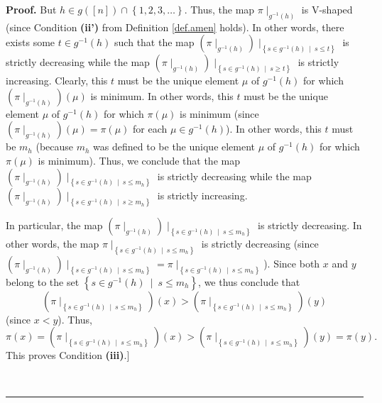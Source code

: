 \documentclass[numbers=enddot,12pt,final,onecolumn,notitlepage]{scrartcl}%
\theoremstyle{definition}
\newenvironment{proof}[1][Proof]{\noindent\textbf{#1.} }{\ \rule{0.5em}{0.5em}}
\newenvironment{verlong}{}{}
\begin{document}
\begin{verlong}
\begin{proof}
But $h\in g\left(  \left[  n\right]  \right)  \cap\left\{  1,2,3,\ldots
\right\}  $. Thus, the map $\pi\mid_{g^{-1}\left(  h\right)  }$ is V-shaped
(since Condition \textbf{(ii')} from Definition \ref{def.amen} holds). In
other words, there exists some $t\in g^{-1}\left(  h\right)  $ such that the
map $\left(  \pi\mid_{g^{-1}\left(  h\right)  }\right)  \mid_{\left\{  s\in
g^{-1}\left(  h\right)  \ \mid\ s\leq t\right\}  }$ is strictly decreasing
while the map $\left(  \pi\mid_{g^{-1}\left(  h\right)  }\right)
\mid_{\left\{  s\in g^{-1}\left(  h\right)  \ \mid\ s\geq t\right\}  }$ is
strictly increasing. Clearly, this $t$ must be the unique element $\mu$ of
$g^{-1}\left(  h\right)  $ for which $\left(  \pi\mid_{g^{-1}\left(  h\right)
}\right)  \left(  \mu\right)  $ is minimum. In other words, this $t$ must be
the unique element $\mu$ of $g^{-1}\left(  h\right)  $ for which $\pi\left(
\mu\right)  $ is minimum (since $\left(  \pi\mid_{g^{-1}\left(  h\right)
}\right)  \left(  \mu\right)  =\pi\left(  \mu\right)  $ for each $\mu\in
g^{-1}\left(  h\right)  $). In other words, this $t$ must be $m_{h}$ (because
$m_{h}$ was defined to be the unique element $\mu$ of $g^{-1}\left(  h\right)
$ for which $\pi\left(  \mu\right)  $ is minimum). Thus, we conclude that the
map $\left(  \pi\mid_{g^{-1}\left(  h\right)  }\right)  \mid_{\left\{  s\in
g^{-1}\left(  h\right)  \ \mid\ s\leq m_{h}\right\}  }$ is strictly decreasing
while the map \newline$\left(  \pi\mid_{g^{-1}\left(  h\right)  }\right)
\mid_{\left\{  s\in g^{-1}\left(  h\right)  \ \mid\ s\geq m_{h}\right\}  }$ is
strictly increasing.

In particular, the map $\left(  \pi\mid_{g^{-1}\left(  h\right)  }\right)
\mid_{\left\{  s\in g^{-1}\left(  h\right)  \ \mid\ s\leq m_{h}\right\}  }$ is
strictly decreasing. In other words, the map $\pi\mid_{\left\{  s\in
g^{-1}\left(  h\right)  \ \mid\ s\leq m_{h}\right\}  }$ is strictly decreasing
(since \newline$\left(  \pi\mid_{g^{-1}\left(  h\right)  }\right)
\mid_{\left\{  s\in g^{-1}\left(  h\right)  \ \mid\ s\leq m_{h}\right\}  }%
=\pi\mid_{\left\{  s\in g^{-1}\left(  h\right)  \ \mid\ s\leq m_{h}\right\}
}$). Since both $x$ and $y$ belong to the set $\left\{  s\in g^{-1}\left(
h\right)  \ \mid\ s\leq m_{h}\right\}  $, we thus conclude that%
\[
\left(  \pi\mid_{\left\{  s\in g^{-1}\left(  h\right)  \ \mid\ s\leq
m_{h}\right\}  }\right)  \left(  x\right)  >\left(  \pi\mid_{\left\{  s\in
g^{-1}\left(  h\right)  \ \mid\ s\leq m_{h}\right\}  }\right)  \left(
y\right)
\]
(since $x<y$). Thus,%
\[
\pi\left(  x\right)  =\left(  \pi\mid_{\left\{  s\in g^{-1}\left(  h\right)
\ \mid\ s\leq m_{h}\right\}  }\right)  \left(  x\right)  >\left(  \pi
\mid_{\left\{  s\in g^{-1}\left(  h\right)  \ \mid\ s\leq m_{h}\right\}
}\right)  \left(  y\right)  =\pi\left(  y\right)  .
\]
This proves Condition \textbf{(iii)}.]


\end{proof}
\end{verlong}
\end{document}
